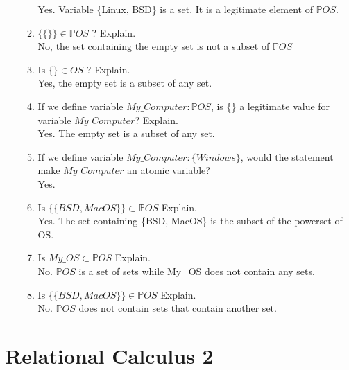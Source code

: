 \documentclass[12pt]{article}
\begin{document}
\begin{itemize}
\begin{enumerate}
                        \noindent Yes. Variable \{Linux, BSD\} is a set. It is a legitimate element of $\mathbb{P} OS$.
                  \item $ \{\{\}\} \in \mathbb{P} OS$ ? Explain.\\
                        \noindent No, the set containing the empty set is not a subset of $\mathbb{P} OS$
                  \item Is $ \{\} \in OS$ ? Explain.\\
                        \noindent Yes, the empty set is a subset of any set.
                  \item If we define variable $My\_Computer : \mathbb{P} OS$, is \{\} a legitimate value for variable $My\_Computer$? Explain.\\
                        \noindent Yes. The empty set is a subset of any set.
                  \item If we define variable $My\_Computer : \{Windows\}$, would the statement make $My\_Computer$ an atomic variable?\\
                        \noindent Yes.
                  \item Is $\{\{BSD, MacOS\}\} \subset \mathbb{P} OS$ Explain.\\
                        \noindent Yes. The set containing \{BSD, MacOS\} is the subset of the powerset of OS.
                  \item Is $My\_OS \subset \mathbb{P} OS$ Explain.\\
                        \noindent No. $\mathbb{P} OS$ is a set of sets while My\_OS does not contain any sets.
                  \item Is $\{\{BSD, MacOS\}\} \in \mathbb{P} OS$ Explain.\\
                        \noindent No. $\mathbb{P} OS$ does not contain sets that contain another set.
            \end{enumerate}
            \newpage



\end{itemize}
\section{Relational Calculus 2}
\end{document}
